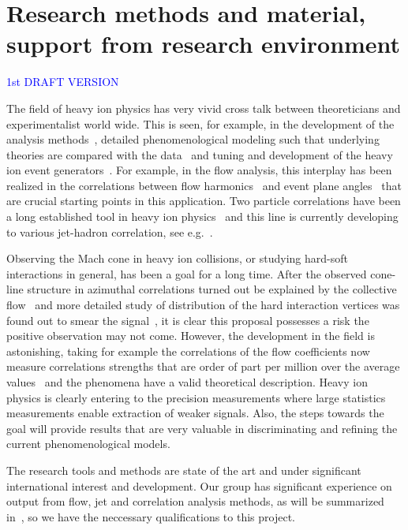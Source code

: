 \section{Research methods and material, support from research environment} %
\label{sec:researchmethods}

\textcolor{blue}{1st DRAFT VERSION}

The field of heavy ion physics has very vivid cross talk between theoreticians and experimentalist world wide. This is seen, for example, in the development of the analysis methods~\cite{Poskanzer:1998yz,Bilandzic:2010jr}, detailed phenomenological modeling such that underlying theories are compared with the data~\cite{Burke:2013yra,Renk:2011gj,Niemi:2015qia} and tuning and development of the heavy ion event generators~\cite{Gyulassy:1994ew,Lin:2004en,Lokhtin2006}. For example, in the flow analysis, this interplay has been realized in the correlations between flow harmonics~\cite{Poskanzer:1998yz,ALICE:2011ab} and event plane angles~\cite{Aad:2014fla,Bhalerao:2014xra} that are crucial starting points in this application. Two particle correlations have been a long established tool in heavy ion physics~\cite{PhysRevLett.95.152301,PhysRevLett.97.052301} and this line is currently developing to various jet-hadron correlation, see e.g.~\cite{Khachatryan:2016tfj}. 

Observing the Mach cone in heavy ion collisions, or studying hard-soft interactions in general, has been a goal for a long time. After the observed cone-line structure in azimuthal correlations turned out be explained by the collective flow~\cite{ALICE:2011ab} and more detailed study of distribution of the hard interaction vertices was found out to smear the signal~\cite{Tachibana:2015qxa}, it is clear this proposal possesses a risk the positive observation may not come. However, the development in the field is astonishing, taking for example the correlations of the flow coefficients now measure correlations strengths that are order of part per million over the average values~\cite{ALICE:2016kpq} and the phenomena have a valid theoretical description. Heavy ion physics is clearly entering to the precision measurements where large statistics measurements enable extraction of weaker signals. Also, the steps towards the goal will provide results that are very valuable in discriminating and refining the current phenomenological models.

The research tools and methods are state of the art and under significant international interest and development. Our group has significant experience on output from flow, jet and correlation analysis methods, as will be summarized in~\label{sec:reseachteam}, so we have the neccessary qualifications to this project.

